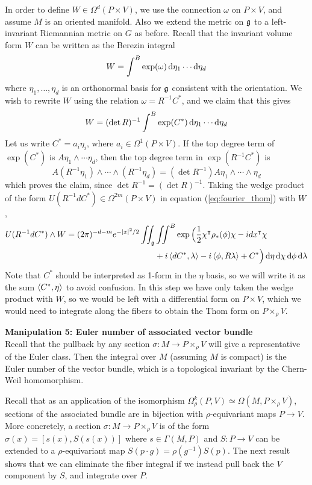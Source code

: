 In order to define $W\in \Omega^d(P\times V)$, we use the connection $\omega$ 
on $P\times V$, and assume $M$ is an oriented manifold. Also we
extend the metric on  $\operatorname{\mathfrak{g}}$ to a left-invariant Riemannian metric on $G$ as before.
Recall that the invariant volume form $W$ can be written as the Berezin integral
\[
W = \int^B \exp(\omega) \odif{\eta_1}\cdots \odif{\eta_d}
\] 
where $\eta_1,\ldots,\eta_d$ is an orthonormal basis for $\operatorname{\mathfrak{g}}$ consistent with
the orientation. We wish to rewrite $W$ using the relation $\omega = R^{-1}C^*$,
and we claim that this gives 
\[
W = (\det R)^{-1}\int^B \exp(C^*) \odif{\eta_1}\cdots \odif{\eta_d}
\] 
Let us write $C^* = a_i\eta_i$, where  $a_i \in \Omega^1(P\times V)$. 
If the top degree term of $\exp(C^*)$ is  $A \eta_1\wedge\cdots\eta_d$, then
the top degree term in $\exp(R^{-1}C^*)$ is 
\[
A (R^{-1}\eta_1)\wedge\cdots\wedge(R^{-1}\eta_d)
=(\det R^{-1}) A \eta_1\wedge\cdots\wedge\eta_d
\] 
which proves the claim, since $\det R^{-1} = (\det R)^{-1}$.
Taking the wedge product of the form 
$U(R^{-1}dC^*) \in \Omega^{2m}(P\times V)$ in equation 
(\ref{eq:fourier_thom}) with $W$,
\begin{align} \label{eq:AJ_formula_thom}
U(R^{-1}dC^*)\wedge W	
= (2\pi)^{-d-m}e^{-\abs{x}^2 /2}\iint_{\g}&\iint^B 
	\exp\Big(\frac{1}{2}\chi^{\intercal}\rho_*(\phi)\chi - idx^\intercal \chi\\
	&+i\gen{dC^*,\lambda}-i\gen{\phi,R\lambda} + C^*\Big)  \odif{\eta}
	\odif{\chi} \odif{\phi}\odif{\lambda}  \nonumber 
\end{align}
Note that $C^*$ should be interpreted as 1-form in the $\eta$ basis,
so we will write it as the sum $\gen{C^*,\eta}$ to avoid confusion.
In this step we have only taken the wedge product with $W$, so we would be left 
with a differential form on  $P\times V$, which we would need to integrate along 
the fibers to obtain the Thom form on $P\times_\rho V$. 

\vspace{1ex}\noindent
\textbf{Manipulation 5: Euler number of associated vector bundle} \\
Recall that the pullback by any section $\sigma:M\to P\times_\rho V$ will give a
representative of the Euler class. 
Then the integral over $M$ (assuming $M$ is compact) is the Euler number of the 
vector bundle, which is a topological invariant by the Chern-Weil homomorphism. 

Recall that as an application of the isomorphism $\Omega_\rho^k(P,V)\simeq
\Omega(M,P\times_\rho V)$, sections of the associated bundle are in bijection
with $\rho$-equivariant maps  $P\to V$. More concretely, a section $\sigma :
M\to P\times_\rho V$ is of the form $\sigma(x) = 
[s(x),S(s(x))]$ where $s\in\Gamma(M,P)$ and  $S:P \to V$ can be extended
to a $\rho$-equivariant map $S(p\cdot g)=\rho(g^{-1})S(p)$. The next result
shows that 
we can eliminate the fiber integral if we instead pull back the $V$ component
by $S$, and integrate over $P$. 


